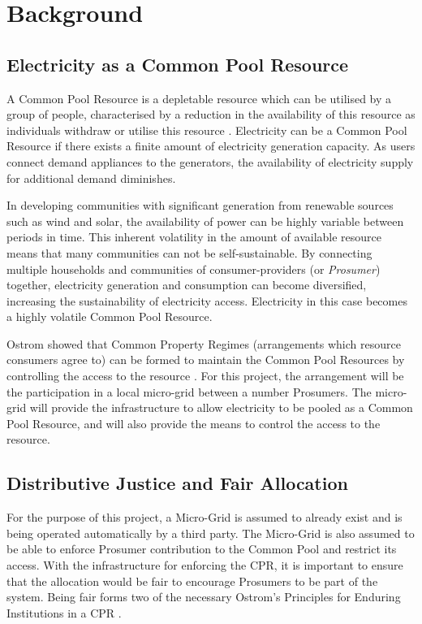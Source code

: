 \chapter{Background}
\label{Background}

\section*{Electricity as a Common Pool Resource}
A Common Pool Resource is a depletable resource which can be utilised by a group of people, characterised by a reduction in the availability of this resource as individuals withdraw or utilise this resource \cite{Ostrom:90}.  Electricity can be a Common Pool Resource if there exists a finite amount of electricity generation capacity. As users connect demand appliances to the generators, the availability of electricity supply for additional demand diminishes.

In developing communities with significant generation from renewable sources such as wind and solar, the availability of power can be highly variable between periods in time. This inherent volatility in the amount of available resource means that many communities can not be self-sustainable. By connecting multiple households and communities of consumer-providers (or \textit{Prosumer}) together, electricity generation and consumption can become diversified, increasing the sustainability of electricity access. Electricity in this case becomes a highly volatile Common Pool Resource.

Ostrom showed that Common Property Regimes (arrangements which resource consumers agree to) can be formed to maintain the Common Pool Resources by controlling the access to the resource \cite{Ostrom:90}. For this project, the arrangement will be the participation in a local micro-grid between a number Prosumers. The micro-grid will provide the infrastructure to allow electricity to be pooled as a Common Pool Resource, and will also provide the means to control the access to the resource.

\section*{Distributive Justice and Fair Allocation}
For the purpose of this project, a Micro-Grid is assumed to already exist and is being operated automatically by a third party. The Micro-Grid is also assumed to be able to enforce Prosumer contribution to the Common Pool and restrict its access. With the infrastructure for enforcing the \ac{CPR}, it is important to ensure that the allocation would be fair to encourage Prosumers to be part of the system. Being fair forms two of the necessary Ostrom's Principles for Enduring Institutions in a CPR \cite{Ostrom:90}. \\

